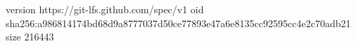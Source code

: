 version https://git-lfs.github.com/spec/v1
oid sha256:a986814174bd68d9a8777037d50ce77893e47a6e8135cc92595cc4e2c70adb21
size 216443
